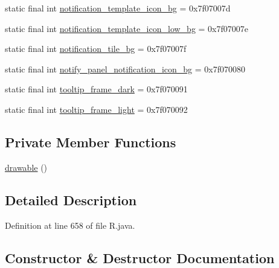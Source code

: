 \begin{DoxyCompactItemize}
\item 
static final int \mbox{\hyperlink{classandroid_1_1support_1_1design_1_1_r_1_1drawable_ad7bdcd3290edcef20952638a119d6d7d}{notification\+\_\+template\+\_\+icon\+\_\+bg}} = 0x7f07007d
\item 
static final int \mbox{\hyperlink{classandroid_1_1support_1_1design_1_1_r_1_1drawable_ae8372977a726225f12d335b46c8cbdd4}{notification\+\_\+template\+\_\+icon\+\_\+low\+\_\+bg}} = 0x7f07007e
\item 
static final int \mbox{\hyperlink{classandroid_1_1support_1_1design_1_1_r_1_1drawable_aed253f648342d853c111c529ab96e605}{notification\+\_\+tile\+\_\+bg}} = 0x7f07007f
\item 
static final int \mbox{\hyperlink{classandroid_1_1support_1_1design_1_1_r_1_1drawable_a67fcab12d08eec3c5fd99deabf1e0c18}{notify\+\_\+panel\+\_\+notification\+\_\+icon\+\_\+bg}} = 0x7f070080
\item 
static final int \mbox{\hyperlink{classandroid_1_1support_1_1design_1_1_r_1_1drawable_ad541536a37b940afd49330600c8e6fb1}{tooltip\+\_\+frame\+\_\+dark}} = 0x7f070091
\item 
static final int \mbox{\hyperlink{classandroid_1_1support_1_1design_1_1_r_1_1drawable_aafa93bfc1b95635189723fd95253b79c}{tooltip\+\_\+frame\+\_\+light}} = 0x7f070092
\end{DoxyCompactItemize}
\subsection*{Private Member Functions}
\begin{DoxyCompactItemize}
\item 
\mbox{\hyperlink{classandroid_1_1support_1_1design_1_1_r_1_1drawable_a0cf5588240d9d8a4858953a7fd155cb8}{drawable}} ()
\end{DoxyCompactItemize}


\subsection{Detailed Description}


Definition at line 658 of file R.\+java.



\subsection{Constructor \& Destructor Documentation}
\mbox{\label{classandroid_1_1support_1_1design_1_1_r_1_1drawable_a0cf5588240d9d8a4858953a7fd155cb8}} 
